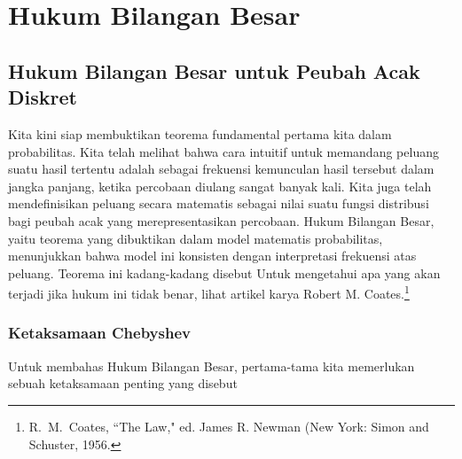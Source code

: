 \chapter{Hukum Bilangan Besar}\label{chp 8} 

\section[Peubah Acak Diskret]{Hukum Bilangan Besar untuk Peubah Acak Diskret}
\label{sec 8.1}
Kita kini siap membuktikan teorema fundamental pertama kita dalam probabilitas.  
Kita telah melihat bahwa cara intuitif untuk memandang peluang suatu hasil tertentu adalah sebagai 
frekuensi kemunculan hasil tersebut dalam jangka panjang, ketika percobaan diulang sangat 
banyak kali.  Kita juga telah mendefinisikan peluang secara matematis sebagai nilai suatu fungsi 
distribusi bagi peubah acak yang merepresentasikan percobaan.   Hukum Bilangan Besar, yaitu
teorema yang dibuktikan dalam model matematis probabilitas, menunjukkan bahwa model ini konsisten 
dengan interpretasi frekuensi atas peluang.  Teorema ini kadang-kadang disebut   Untuk mengetahui apa yang akan terjadi jika hukum ini tidak benar, lihat artikel karya 
Robert M. Coates.\footnote{R.~M.~Coates, ``The Law,"  ed. James R. Newman (New York: Simon and Schuster, 1956.}

\subsection*{Ketaksamaan Chebyshev}
Untuk membahas Hukum Bilangan Besar, pertama-tama kita memerlukan sebuah ketaksamaan penting
yang disebut 

